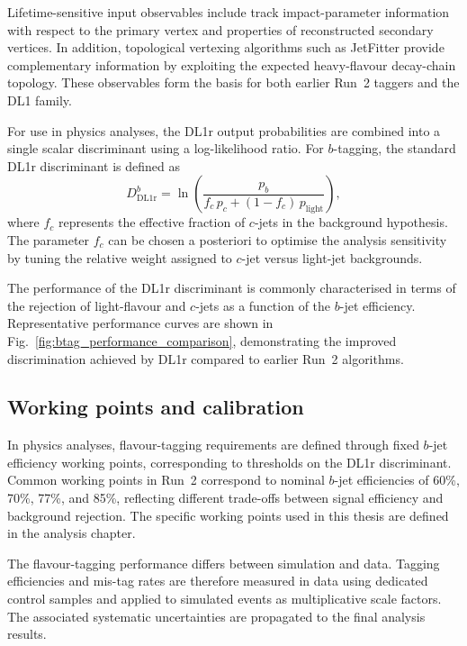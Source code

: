 Lifetime-sensitive input observables include track impact-parameter information
with respect to the primary vertex and properties of reconstructed secondary
vertices.
In addition, topological vertexing algorithms such as JetFitter provide
complementary information by exploiting the expected heavy-flavour decay-chain
topology.
These observables form the basis for both earlier Run~2 taggers and the DL1 family.

For use in physics analyses, the DL1r output probabilities are combined into a
single scalar discriminant using a log-likelihood ratio.
For $b$-tagging, the standard DL1r discriminant is defined as
\begin{equation}
D_{\mathrm{DL1r}}^{b} =
\ln\left(
\frac{p_b}{f_c\,p_c + (1-f_c)\,p_{\mathrm{light}}}
\right),
\end{equation}
where $f_c$ represents the effective fraction of $c$-jets in the background
hypothesis.
The parameter $f_c$ can be chosen a posteriori to optimise the analysis sensitivity
by tuning the relative weight assigned to $c$-jet versus light-jet backgrounds.

The performance of the DL1r discriminant is commonly characterised in terms of the
rejection of light-flavour and $c$-jets as a function of the $b$-jet efficiency.
Representative performance curves are shown in Fig.~\ref{fig:btag_performance_comparison},
demonstrating the improved discrimination achieved by DL1r compared to earlier
Run~2 algorithms.

\subsection{Working points and calibration}

In physics analyses, flavour-tagging requirements are defined through fixed
$b$-jet efficiency working points, corresponding to thresholds on the DL1r
discriminant.
Common working points in Run~2 correspond to nominal $b$-jet efficiencies of
60\%, 70\%, 77\%, and 85\%, reflecting different trade-offs between signal
efficiency and background rejection.
The specific working points used in this thesis are defined in the analysis
chapter.

The flavour-tagging performance differs between simulation and data.
Tagging efficiencies and mis-tag rates are therefore measured in data using
dedicated control samples and applied to simulated events as multiplicative scale
factors.
The associated systematic uncertainties are propagated to the final analysis
results.

